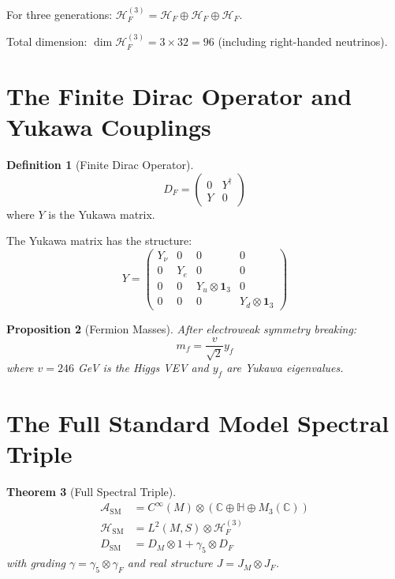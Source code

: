 \documentclass[11pt,a4paper,openright]{book}
\theoremstyle{plain}
\newtheorem{theorem}{Theorem}[chapter]
\newtheorem{proposition}[theorem]{Proposition}
\theoremstyle{definition}
\newtheorem{definition}[theorem]{Definition}
\newcommand{\Hil}{\mathcal{H}}
\newcommand{\A}{\mathcal{A}}
\newcommand{\SM}{\mathrm{SM}}
\newcommand{\C}{\mathbb{C}}
\begin{document}
For three generations: $\Hil_F^{(3)} = \Hil_F \oplus \Hil_F \oplus \Hil_F$.

Total dimension: $\dim \Hil_F^{(3)} = 3 \times 32 = 96$ (including right-handed neutrinos).

\section{The Finite Dirac Operator and Yukawa Couplings}

\begin{definition}[Finite Dirac Operator]
\begin{equation}
D_F = \begin{pmatrix} 0 & Y^\dagger \\ Y & 0 \end{pmatrix}
\end{equation}
where $Y$ is the Yukawa matrix.
\end{definition}

The Yukawa matrix has the structure:
\begin{equation}
Y = \begin{pmatrix}
Y_\nu & 0 & 0 & 0 \\
0 & Y_e & 0 & 0 \\
0 & 0 & Y_u \otimes \mathbf{1}_3 & 0 \\
0 & 0 & 0 & Y_d \otimes \mathbf{1}_3
\end{pmatrix}
\end{equation}

\begin{proposition}[Fermion Masses]
After electroweak symmetry breaking:
\begin{equation}
m_f = \frac{v}{\sqrt{2}} y_f
\end{equation}
where $v = 246$ GeV is the Higgs VEV and $y_f$ are Yukawa eigenvalues.
\end{proposition}

\section{The Full Standard Model Spectral Triple}

\begin{theorem}[Full Spectral Triple]
\begin{align}
\A_{\SM} &= C^\infty(M) \otimes (\C \oplus \mathbb{H} \oplus M_3(\C)) \\
\Hil_{\SM} &= L^2(M, S) \otimes \Hil_F^{(3)} \\
D_{\SM} &= D_M \otimes 1 + \gamma_5 \otimes D_F
\end{align}
with grading $\gamma = \gamma_5 \otimes \gamma_F$ and real structure $J = J_M \otimes J_F$.
\end{theorem}
\end{document}
